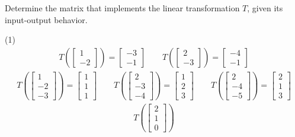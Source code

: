 Determine the matrix that implements the linear transformation $T$,
given its input-output behavior.
\begin{tasks}[resume, style=enumerate](1)
\task
  \begin{align*}
    T\left(\begin{bmatrix} 1 \\ -2 \end{bmatrix}\right)
    = \begin{bmatrix} -3 \\ -1 \end{bmatrix}
    \qquad
    T\left(\begin{bmatrix} 2 \\ -3 \end{bmatrix}\right)
    = \begin{bmatrix} -4 \\ -1 \end{bmatrix}
  \end{align*}
\task
  \begin{align*}
    T\left(\begin{bmatrix} 1 \\ -2 \\ -3 \end{bmatrix}\right)
    = \begin{bmatrix} 1 \\ 1 \\ 1 \end{bmatrix}
    \qquad
    T\left(\begin{bmatrix} 2 \\ -3 \\ -4 \end{bmatrix}\right)
    = \begin{bmatrix} 1 \\ 2 \\ 3 \end{bmatrix}
    \qquad
    T\left(\begin{bmatrix} 2 \\ -4 \\ -5 \end{bmatrix}\right)
    = \begin{bmatrix} 2 \\ 1 \\ 3 \end{bmatrix}
  \end{align*}
\task
  \begin{align*}
    T\left(\begin{bmatrix} 2 \\ 1 \\ 0 \end{bmatrix} \right)

\end{align*}
\end{tasks}
